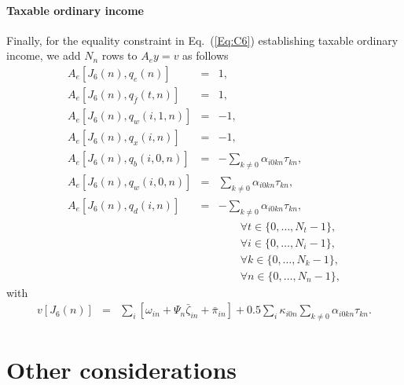 \documentclass{report}[fleqn,11pt]
\begin{document}
\paragraph*{Taxable ordinary income}
Finally, for the equality constraint in Eq.~(\ref{Eq:C6}) establishing taxable
ordinary income, we add $N_n$ rows to $A_ey = v$ as follows
\begin{eqnarray}
	A_e[J_6(n), q_e(n)] &=& 1, \nonumber \\
	A_e[J_6(n), q_{\bar{f}}(t, n)] &=& 1, \nonumber \\
	A_e[J_6(n), q_w(i, 1, n)] &=& -1, \nonumber \\
	A_e[J_6(n), q_x(i, n)] &=& -1, \nonumber \\
	A_e[J_6(n), q_b(i, 0, n)] &=& -\sum_{k\neq 0} \alpha_{i0kn}\tau_{kn}, \\
	A_e[J_6(n), q_w(i, 0, n)] &=&  \sum_{k\neq 0} \alpha_{i0kn}\tau_{kn}, \nonumber \\
	A_e[J_6(n), q_d(i, n)] &=&    -\sum_{k\neq 0} \alpha_{i0kn}\tau_{kn}, \nonumber \\
	&&\qquad\forall t \in \{0,\ldots, N_t-1\},\nonumber\\
	&&\qquad\forall i \in \{0,\ldots, N_i-1\},\nonumber\\
	&&\qquad\forall k \in \{0,\ldots, N_k-1\},\nonumber\\
	&&\qquad\forall n \in \{0,\ldots, N_n-1\}, \nonumber
\end{eqnarray}
with
\begin{eqnarray}
	v[J_6(n)] &=& 
	\sum_i [\omega_{in} + \Psi_n\bar\zeta_{in}  + \bar{\pi}_{in}]
	+ 0.5\sum_{i} \kappa_{i0n} \sum_{k\neq 0} \alpha_{i0kn}\tau_{kn}.
\end{eqnarray}

\section{Other considerations}
\end{document}
